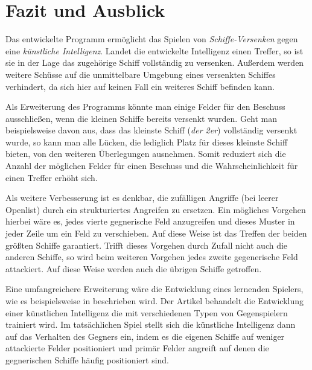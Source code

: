 \section{Fazit und Ausblick} \label{sec:Ausblick}
	Das entwickelte Programm ermöglicht das Spielen von \textit{Schiffe-Versenken} gegen eine \textit{künstliche Intelligenz}. 
	Landet die entwickelte Intelligenz einen Treffer, so ist sie in der Lage das zugehörige Schiff vollständig zu versenken. 
	Außerdem werden weitere Schüsse auf die unmittelbare Umgebung eines versenkten Schiffes verhindert, da sich hier auf keinen Fall ein
	weiteres Schiff befinden kann.
	
	Als Erweiterung des Programms könnte man einige Felder für den Beschuss ausschließen, wenn die kleinen Schiffe bereits versenkt wurden.
	Geht man beispielsweise davon aus, dass das kleinste Schiff (\textit{der 2er}) vollständig versenkt wurde, so kann man alle 
	Lücken, die lediglich Platz für dieses kleinste Schiff bieten, von den weiteren Überlegungen ausnehmen. Somit reduziert sich die 
	Anzahl der möglichen Felder für einen Beschuss und die Wahrscheinlichkeit für einen Treffer erhöht sich.

	Als weitere Verbesserung ist es denkbar, die zufälligen Angriffe (bei leerer Openlist) durch ein strukturiertes Angreifen zu ersetzen.
	Ein mögliches Vorgehen hierbei wäre es, jedes vierte gegnerische Feld anzugreifen und dieses Muster in jeder Zeile um ein Feld zu verschieben.  
	Auf diese Weise ist das Treffen der beiden größten Schiffe garantiert. Trifft dieses Vorgehen durch Zufall nicht auch die anderen 
	Schiffe, so wird beim weiteren Vorgehen jedes zweite gegenerische Feld attackiert. Auf diese Weise werden auch die übrigen Schiffe getroffen.
	
	
	Eine umfangreichere Erweiterung wäre die Entwicklung eines lernenden Spielers, wie es beispielsweise in \cite{intelligentesversenken}
	beschrieben wird. Der Artikel behandelt die Entwicklung einer künstlichen Intelligenz die mit verschiedenen Typen von Gegenspielern
	trainiert wird. Im tatsächlichen Spiel stellt sich die künstliche Intelligenz dann auf das Verhalten des Gegners ein, indem es die
	eigenen Schiffe auf weniger attackierte Felder positioniert und primär Felder angreift auf denen die 
	gegnerischen Schiffe häufig positioniert sind.


